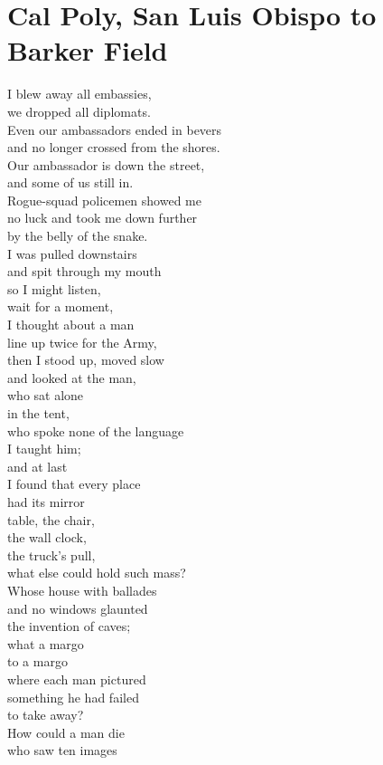 \documentclass[smalldemyvopaper,11pt,twoside,onecolumn,openright,extrafontsizes]{memoir}
\newlength\drop
\begin{document}
\chapter{Cal Poly, San Luis Obispo to Barker Field}
I blew away all embassies,
\\we dropped all diplomats.
\\Even our ambassadors ended in bevers
\\and no longer crossed from the shores.
\\Our ambassador is down the street,
\\and some of us still in.
\\Rogue-squad policemen showed me
\\no luck and took me down further
\\by the belly of the snake.
\\I was pulled downstairs
\\and spit through my mouth
\\so I might listen,
\\wait for a moment,
\\I thought about a man
\\line up twice for the Army,
\\then I stood up, moved slow
\\and looked at the man,
\\who sat alone
\\in the tent,
\\who spoke none of the language
\\I taught him;
\\and at last
\\I found that every place
\\had its mirror
\\table, the chair,
\\the wall clock,
\\the truck's pull,
\\what else could hold such mass?
\\Whose house with ballades
\\and no windows glaunted
\\the invention of caves;
\\what a margo
\\to a margo
\\where each man pictured
\\something he had failed
\\to take away?
\\How could a man die
\\who saw ten images
\end{document}

